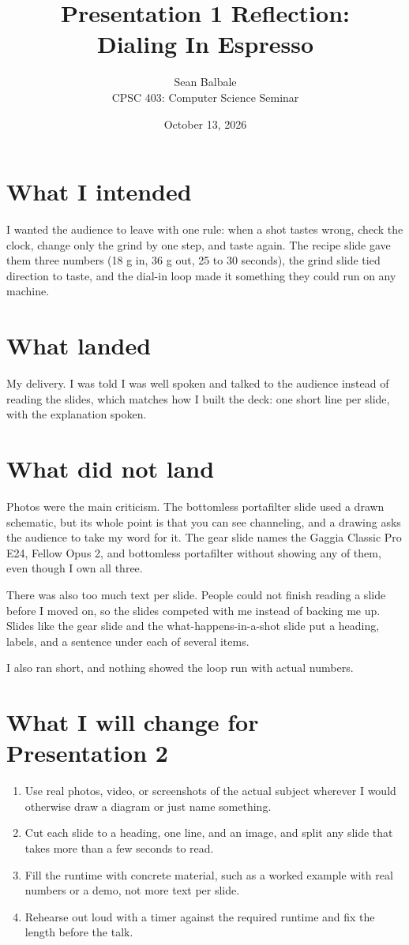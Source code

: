 \documentclass[11pt]{article}
\title{\vspace{-2em}Presentation 1 Reflection: \\ \large Dialing In Espresso}
\author{Sean Balbale \\ CPSC 403: Computer Science Seminar}
\date{October 13, 2026}
\begin{document}
\maketitle
\vspace{-1.5em}

\section{What I intended}
I wanted the audience to leave with one rule: when a shot tastes wrong, check the clock, change only the grind by one step, and taste again. The recipe slide gave them three numbers (18 g in, 36 g out, 25 to 30 seconds), the grind slide tied direction to taste, and the dial-in loop made it something they could run on any machine.

\section{What landed}
My delivery. I was told I was well spoken and talked to the audience instead of reading the slides, which matches how I built the deck: one short line per slide, with the explanation spoken.
\section{What did not land}
Photos were the main criticism. The bottomless portafilter slide used a drawn schematic, but its whole point is that you can see channeling, and a drawing asks the audience to take my word for it. The gear slide names the Gaggia Classic Pro E24, Fellow Opus 2, and bottomless portafilter without showing any of them, even though I own all three.

There was also too much text per slide. People could not finish reading a slide before I moved on, so the slides competed with me instead of backing me up. Slides like the gear slide and the what-happens-in-a-shot slide put a heading, labels, and a sentence under each of several items.

I also ran short, and nothing showed the loop run with actual numbers.

\section{What I will change for Presentation 2}
\begin{enumerate}
  \item Use real photos, video, or screenshots of the actual subject wherever I would otherwise draw a diagram or just name something.
  \item Cut each slide to a heading, one line, and an image, and split any slide that takes more than a few seconds to read.
  \item Fill the runtime with concrete material, such as a worked example with real numbers or a demo, not more text per slide.
  \item Rehearse out loud with a timer against the required runtime and fix the length before the talk.
\end{enumerate}
\end{document}
